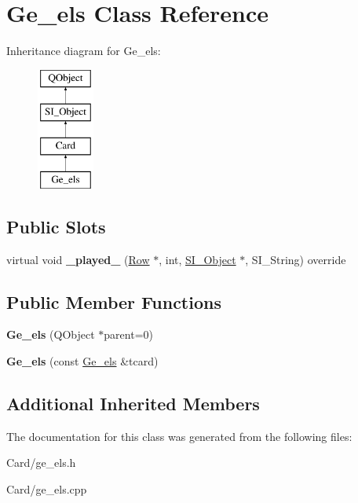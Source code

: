 \hypertarget{class_ge__els}{}\section{Ge\+\_\+els Class Reference}
\label{class_ge__els}
Inheritance diagram for Ge\+\_\+els\+:\begin{figure}[H]
\begin{center}
\leavevmode
\includegraphics[height=4.000000cm]{class_ge__els}
\end{center}
\end{figure}
\subsection*{Public Slots}
\begin{DoxyCompactItemize}
\item 
\mbox{\label{class_ge__els_afa37588d63eac35cdfd39142c6914d00}} 
virtual void {\bfseries \+\_\+played\+\_\+} (\hyperlink{class_card_set}{Row} $\ast$, int, \hyperlink{class_s_i___object}{S\+I\+\_\+\+Object} $\ast$, S\+I\+\_\+\+String) override
\end{DoxyCompactItemize}
\subsection*{Public Member Functions}
\begin{DoxyCompactItemize}
\item 
\mbox{\label{class_ge__els_a38db702ecaa2e340e7d82edfe447e3f9}} 
{\bfseries Ge\+\_\+els} (Q\+Object $\ast$parent=0)
\item 
\mbox{\label{class_ge__els_ae994d286721cb8e3daaebcced4110a45}} 
{\bfseries Ge\+\_\+els} (const \hyperlink{class_ge__els}{Ge\+\_\+els} \&tcard)
\end{DoxyCompactItemize}
\subsection*{Additional Inherited Members}


The documentation for this class was generated from the following files\+:\begin{DoxyCompactItemize}
\item 
Card/ge\+\_\+els.\+h\item 
Card/ge\+\_\+els.\+cpp\end{DoxyCompactItemize}
